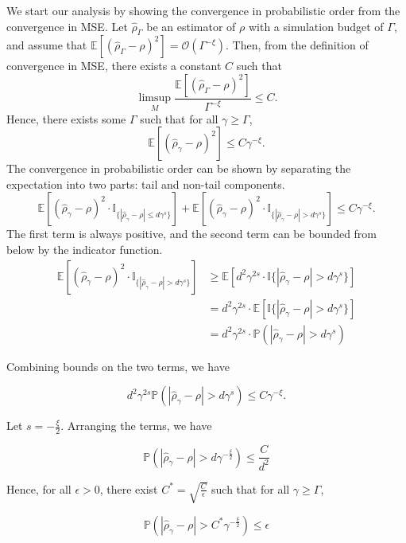 We start our analysis by showing the convergence in probabilistic order from the convergence in MSE.
Let $\hat{\rho}_{\Gamma}$ be an estimator of $\rho$ with a simulation budget of $\Gamma$, and assume that $\mathbb{E} \left[ \left(\hat{\rho}_{\Gamma} - \rho\right)^2 \right] = \mathcal{O} \left( \Gamma^{-\xi} \right)$.
Then, from the definition of convergence in MSE, there exists a constant $C$ such that 
$$
    \limsup_{M} \frac{\mathbb{E} \left[ \left(\hat{\rho}_{\Gamma} - \rho\right)^2 \right]}{\Gamma^{-\xi}} \leq C.
$$
Hence, there exists some $\Gamma$ such that for all $\gamma \geq \Gamma$,
$$
\mathbb{E} \left[ \left(\hat{\rho}_{\gamma} - \rho\right)^2 \right] \leq C\gamma^{-\xi}.
$$
The convergence in probabilistic order can be shown by separating the expectation into two parts: tail and non-tail components.
$$
\mathbb{E} \left[ \left(\hat{\rho}_{\gamma} - \rho\right)^2 \cdot \mathbb{I}_{\{|\hat{\rho}_{\gamma} - \rho| \leq d\gamma^s\}} \right] + \mathbb{E} \left[ \left(\hat{\rho}_{\gamma} - \rho\right)^2 \cdot \mathbb{I}_{\{|\hat{\rho}_{\gamma} - \rho| > d\gamma^s\}} \right] \leq C\gamma^{-\xi}.
$$
The first term is always positive, and the second term can be bounded from below by the indicator function.
\begin{align*}
\mathbb{E} \left[ \left(\hat{\rho}_{\gamma} - \rho\right)^2 \cdot \mathbb{I}_{\{|\hat{\rho}_{\gamma} - \rho| > d\gamma^s\}} \right] 
& \geq \mathbb{E} \left[ d^2 \gamma^{2s} \cdot \mathbb{I}\{|\hat{\rho}_{\gamma} - \rho| > d\gamma^s\} \right] \\
& = d^2 \gamma^{2s} \cdot \mathbb{E} \left[ \mathbb{I}\{|\hat{\rho}_{\gamma} - \rho| > d\gamma^s \} \right] \\
& = d^2 \gamma^{2s} \cdot \mathbb{P} \left(|\hat{\rho}_{\gamma} - \rho| > d\gamma^s \right)
\end{align*}

Combining bounds on the two terms, we have

$$
    d^2 \gamma^{2s} \mathbb{P} \left(|\hat{\rho}_{\gamma} - \rho| > d\gamma^s \right) \leq C \gamma^{-\xi}.
$$

Let $s = -\frac{\xi}{2}$. Arranging the terms, we have

$$
    \mathbb{P} \left( |\hat{\rho}_{\gamma} - \rho| > d\gamma^{-\frac{\xi}{2}} \right) \leq \frac{C}{d^2}
$$

Hence, for all $\epsilon >0$, there exist $C^* = \sqrt{\frac{C}{\epsilon}}$ such that for all $\gamma \geq \Gamma$,

$$
    \mathbb{P} \left( |\hat{\rho}_{\gamma} - \rho| > C^*\gamma^{-\frac{\xi}{2}} \right) \leq \epsilon
$$

